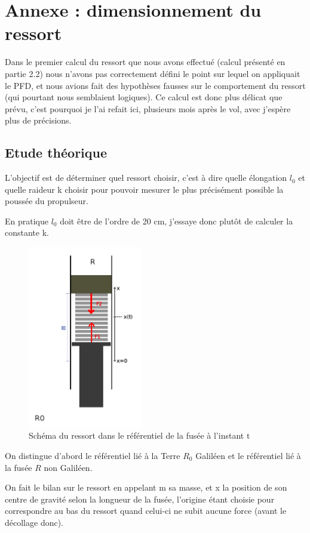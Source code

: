 \documentclass[a4paper,12pt]{scrartcl}
\begin{document}
	\section{Annexe : dimensionnement du ressort}
	
    Dans le premier calcul du ressort que nous avons effectué (calcul présenté en partie 2.2) nous n'avons pas correctement défini le point sur lequel on appliquait le PFD, et nous avions fait des hypothèses fausses sur le comportement du ressort (qui pourtant nous semblaient logiques).
    Ce calcul est donc plus délicat que prévu, c'est pourquoi je l'ai refait ici, plusieurs mois après le vol, avec j'espère plus de précisions.
    
	\subsection{Etude théorique}
	L'objectif est de déterminer quel ressort choisir, c'est à dire quelle élongation $l_0$ et quelle raideur k choisir pour pouvoir 	mesurer le plus précisément possible la poussée du propulseur.


	En pratique $l_0$ doit être de l'ordre de 20 cm, j'essaye donc plutôt de calculer la constante k. \newpage

	\begin{figure}
	\caption{Schéma du ressort dans le référentiel de la fusée à l'instant t}
	\includegraphics[width=5cm]{Photos_Mercury/schema_t.png}
	\end{figure}


	On distingue d'abord le référentiel lié à la Terre $R_0$ Galiléen et le référentiel lié à la fusée $R$ non Galiléen.

	On fait le bilan sur le ressort en appelant m sa masse, et x la position de son centre de gravité selon la longueur de la fusée, 	l'origine étant choisie pour correspondre au bas du ressort quand celui-ci ne subit aucune force (avant le décollage donc).
\end{document}
